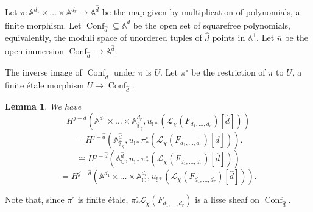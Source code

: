 \documentclass[11pt,letterpaper]{article}
\newtheorem{lemma}[theorem]{Lemma}
\theoremstyle{definition}
\theoremstyle{remark}
\numberwithin{equation}{section}
\theoremstyle{dotless}
\begin{document}
Let $\pi \colon \mathbb A^{d_1} \times \dots \times \mathbb A^{d_r}\to \mathbb A^{\hat{d}}$ be the map given by multiplication of polynomials, a finite morphism. Let $\operatorname{Conf}_{\hat{d}} \subseteq \mathbb A^{\hat{d}}$ be the open set of squarefree polynomials, equivalently, the moduli space of unordered tuples of $\hat{d}$ points in $\mathbb A^1$. Let $\overline{u}$ be the open immersion $\operatorname{Conf}_{\hat{d}} \to \mathbb A^{\hat{d}}$.

The inverse image of $\operatorname{Conf}_{\hat{d}}$ under $\pi$ is $U$. Let $\pi^\circ$ be the restriction of $\pi$ to $U$, a finite \'{e}tale morphism $U \to \operatorname{Conf}_{\hat{d}}$.

\begin{lemma}\label{0-to-p} We have
\[ H^{j-\hat{d}} ( \mathbb A^{d_1 } \times  \dots \times \mathbb A^{ d_r }_{\overline{\mathbb F}_q}, u_{!*} (\mathcal L_{\chi}(F_{d_1,\dots,d_r}) [\hat{d}])) \] \[= H^{j-\hat{d}} ( \mathbb A^{\hat{d} }_{\overline{\mathbb F}_q},  \overline{u} _{!*}  \pi^\circ_* (\mathcal L_{\chi}(F_{d_1,\dots,d_r}) [\hat{d}])).\]
 \[\cong H^{j-\hat{d}} ( \mathbb A^{\hat{d} }_{\mathbb C},  \overline{u} _{!*}  \pi^\circ_* (\mathcal L_{\chi}(F_{d_1,\dots,d_r}) [\hat{d}]))\]
\[ = H^{j-\hat{d}} ( \mathbb A^{d_1 } \times \dots \times \mathbb A^{d_r }_{\mathbb C},   {u} _{!*}   (\mathcal L_{\chi}(F_{d_1,\dots,d_r}) [\hat{d}])).\] \end{lemma}

Note that, since $\pi^\circ$ is finite \'etale, $\pi^\circ_* \mathcal L_{\chi}(F_{d_1,\dots,d_r})$ is a lisse sheaf on $\operatorname{Conf}_{\hat{d}}$.
\end{document}
